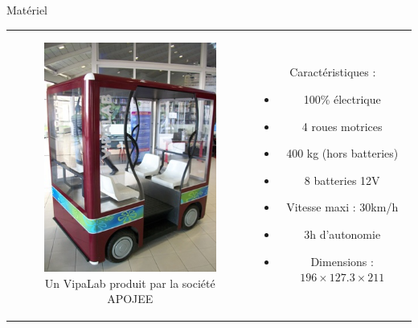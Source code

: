 \documentclass{beamer}
\begin{document}
\begin{frame}{Matériel}
  \begin{tabular}{c c}
    \begin{minipage}{0.5\linewidth}
      \begin{figure}
        \includegraphics[width=0.8\linewidth]{images/VIPALAB.jpg}
        \caption{Un VipaLab produit par la société APOJEE}
      \end{figure}
    \end{minipage}
    &
    \begin{minipage}{0.5\linewidth}
      Caractéristiques :
      \begin{itemize}
      \item 100\% électrique
      \item 4 roues motrices
      \item 400 kg (hors batteries)
      \item 8 batteries 12V
      \item Vitesse maxi : 30km/h
      \item 3h d'autonomie
      \item Dimensions : $196\times127.3\times211$
      \end{itemize}
    \end{minipage}
  \end{tabular}
\end{frame}
\end{document}
